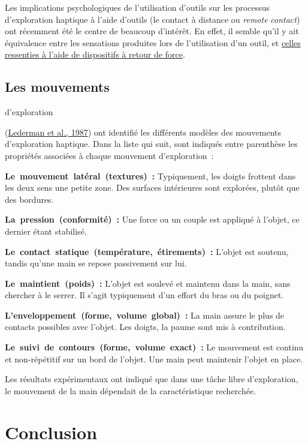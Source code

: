 \documentclass[
]{book}
\begin{document}
Les implications psychologiques de l'utilisation d'outils sur les
processus d'exploration haptique à l'aide d'outils (le contact à distance ou
\emph{remote} \emph{contact}) ont récemment été le centre de beaucoup
d'intérêt. En effet, il semble qu'il y ait équivalence entre les sensations
produites lors de l'utilisation d'un outil, et \href{017-les-applications-du-retour-haptique.html\#toc23}{celles ressenties à l'aide de
dispositifs à retour de force}.

\hypertarget{les-mouvements}{%
\subsection{Les mouvements}\label{les-mouvements}}

d'exploration

(\protect\hyperlink{ref-lederman1987haptic}{Lederman et al., 1987}) ont
identifié les différents modèles des mouvements d'exploration haptique. Dans
la liste qui suit, sont indiqués entre parenthèse les propriétés associées à
chaque mouvement d'exploration~:

\textbf{Le~mouvement~latéral~(textures)~:}
Typiquement, les doigts frottent dans les deux
sens une petite zone. Des surfaces intérieures sont explorées, plutôt que
des bordures.

\textbf{La~pression~(conformité)~:}
Une force ou un couple est appliqué à l'objet,
ce dernier étant stabilisé.

\textbf{Le~contact~statique~(température,~étirements)~:}
L'objet est soutenu, tandis qu'une main se
repose passivement sur lui.

\textbf{Le~maintient~(poids)~:}
L'objet est soulevé et maintenu dans la main,
sans chercher à le serrer. Il s'agit typiquement d'un effort du bras ou du
poignet.

\textbf{L'enveloppement~(forme,~volume~global)~:}
La main assure le plus de contacts possibles
avec l'objet. Les doigts, la paume sont mis à contribution.

\textbf{Le~suivi~de~contours~(forme,~volume~exact)~:}
Le mouvement est continu et non-répétitif sur un
bord de l'objet. Une main peut maintenir l'objet en place.

Les résultats expérimentaux ont indiqué que dans une tâche libre
d'exploration, le mouvement de la main dépendait de la caractéristique
recherchée.

\hypertarget{conclusion}{%
\section{Conclusion}\label{conclusion}}
\end{document}
